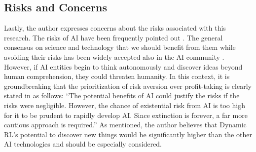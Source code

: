 \subsection{Risks and Concerns}\label{subsec:Risk}
Lastly, the author expresses concerns about the risks associated with this research.
%
%
The risks of AI have been frequently pointed out \citep{Signatories, Doya, AI_Risk}.
The general consensus on science and technology that we should benefit from them while avoiding their risks
has been widely accepted also in the AI community \citep{Signatories, Doya}.
However, if AI entities begin to think autonomously and discover ideas beyond human comprehension,
they could threaten humanity.
In this context, it is groundbreaking that the prioritization of risk aversion over profit-taking is clearly stated in \citep{AI_Risk1} as follows:
``The potential benefits of AI could justify the risks if the risks were negligible.
However, the chance of existential risk from AI is too high for it to be prudent to rapidly develop AI.
Since extinction is forever, a far more cautious approach is required.''
As mentioned, the author believes that Dynamic RL's potential to discover new things would be significantly higher
than the other AI technologies and should be especially considered. 

